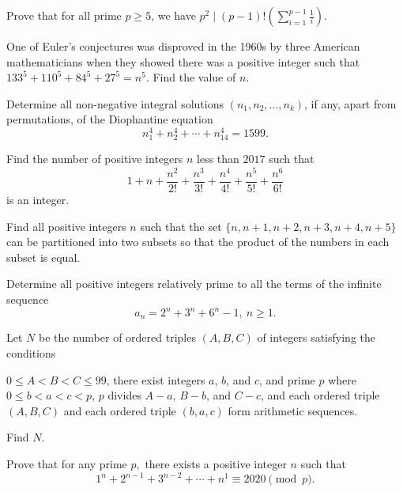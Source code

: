 \documentclass[mast]{lucky}
\begin{document}
\begin{prob}{6}
Prove that for all prime $p\ge5$, we have $p^2\mid (p-1)!\left(\sum\limits_{i=1}^{p-1}\frac1{i}\right)$.
\end{prob}
    
\begin{prob}[AIME 1989/9]{6}
One of Euler's conjectures was disproved in the 1960s by three American mathematicians when they showed there was a positive integer such that $133^5+110^5+84^5+27^5=n^{5}$. Find the value of $n$.
\end{prob}
    
\begin{prob}[USAMO 1979/1]{6}
Determine all non-negative integral solutions $(n_1, n_2, \dots , n_k)$, if any, apart from permutations, of the Diophantine equation
$$n_1^4 + n_2^4 + \cdots + n_{14}^{4} = 1599.$$
\end{prob}

\begin{prob}[AIME II 2017/8]{6}
Find the number of positive integers $n$ less than $2017$ such that
\[ 1+n+\frac{n^2}{2!}+\frac{n^3}{3!}+\frac{n^4}{4!}+\frac{n^5}{5!}+\frac{n^6}{6!} \]is an integer.
\end{prob}

\begin{prob}[IMO 1970/4]{6}
Find all positive integers $n$ such that the set $\{n,n+1,n+2,n+3,n+4,n+5\}$ can be partitioned into two subsets so that the product of the numbers in each subset is equal.
\end{prob}

\begin{prob}[IMO 2005/4]{9}
Determine all positive integers relatively prime to all the terms of the infinite sequence
\[a_n=2^n+3^n+6^n -1,\ n\geq 1.\]
\end{prob}

\begin{prob}[AIME I 2013/15]{13}
Let $N$ be the number of ordered triples $(A,B,C)$ of integers satisfying the conditions
\begin{itemize}
\Item $0\le A<B<C\le99$,
\Item there exist integers $a$, $b$, and $c$, and prime $p$ where $0\le b<a<c<p$,
\Item $p$ divides $A-a$, $B-b$, and $C-c$, and
\Item each ordered triple $(A,B,C)$ and each ordered triple $(b,a,c)$ form arithmetic sequences.
\end{itemize}
Find $N$.
\end{prob}

\begin{prob}[USEMO 2019/4]{13}
Prove that for any prime $p,$ there exists a positive integer $n$ such that
\[1^n+2^{n-1}+3^{n-2}+\cdots+n^1\equiv 2020\pmod{p}.\]
\end{prob}
\end{document}
